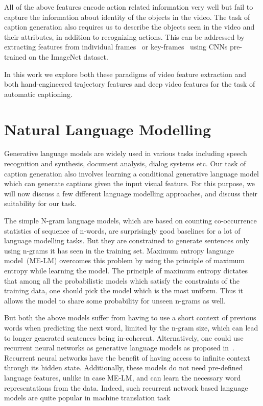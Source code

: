 All of the above features encode action related information very well but fail to
capture the information about identity of the objects in the video.
The task of caption generation also requires us to describe the objects seen in
the video and their attributes, in addition to recognizing actions.
This can be addressed by extracting features from individual
frames~\cite{venugopalan2015sequence} or key-frames~\cite{shetty2015video} using
CNNs pre-trained on the ImageNet dataset.

In this work we explore both these paradigms of video feature extraction and
both hand-engineered trajectory features and deep video features for the task of
automatic captioning.

\section{Natural Language Modelling}
Generative language models are widely used in various tasks including speech
recognition and synthesis, document analysis, dialog systems etc.
Our task of caption generation also involves learning a conditional generative
language model which can generate captions given the input visual feature.
For this purpose, we will now discuss a few different language modelling
approaches, and discuss their suitability for our task.

The simple N-gram language models, which are based on counting co-occurrence
statistics of sequence of n-words, are surprisingly good baselines for a lot of
language modelling tasks.
But they are constrained to generate sentences only using n-grams it has seen in
the training set.
Maximum entropy language model~\cite{berger1996maximum}(ME-LM) overcomes this
problem by using the principle of maximum entropy while learning the model.
The principle of maximum entropy dictates that among all the probabilistic
models which satisfy the constraints of the training data, one should pick the
model which is the most uniform.
Thus it allows the model to share some probability for unseen n-grams as well.

But both the above models suffer from having to use a short context of previous
words when predicting the next word, limited by the n-gram size, which can lead
to longer generated sentences being in-coherent.
Alternatively, one could use recurrent neural networks as generative language
models as proposed in~\cite{mikolov2010recurrent}.
Recurrent neural networks have the benefit of having access to infinite context
through its hidden state.
Additionally, these models do not need pre-defined language features, unlike in case
ME-LM, and can learn the necessary word representations from the data. 
Indeed, such recurrent network based language models are quite popular in
machine translation task~\cite{bahdanau2014neural}

